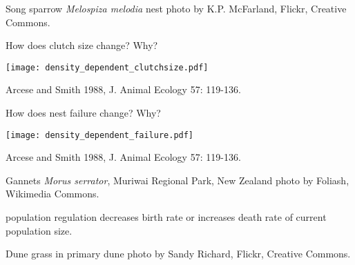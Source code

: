 \documentclass[t]{beamer}
\begin{document}
{
\begin{frame}[b]{}
\Tiny\textcolor{gray!20!white}{Song sparrow \textit{Melospiza melodia} nest photo by K.P. McFarland, Flickr, Creative Commons.}
\end{frame}
}


\begin{frame}[b]{How does clutch size change? Why?}
	\begin{center}
		\texttt{[image: density\_dependent\_clutchsize.pdf]}
	\end{center}	

	\tiny Arcese and Smith 1988, J. Animal Ecology 57: 119-136.
\end{frame}

\begin{frame}[b]{How does nest failure change? Why?}
	\begin{center}
		\texttt{[image: density\_dependent\_failure.pdf]}
	\end{center}	

	\tiny Arcese and Smith 1988, J. Animal Ecology 57: 119-136.
\end{frame}


{
\begin{frame}[b]{}
\Tiny\textcolor{orange5}{Gannets \textit{Morus serrator}, Muriwai Regional Park, New Zealand photo by Foliash, Wikimedia Commons.}
\end{frame}
}

{
\begin{frame}[b]{}
\end{frame}
}


\begin{frame}{}

	\hangpara {} population regulation decreases birth rate or increases death rate  of current population size.
		
\end{frame}

{
\begin{frame}[b]{}
\hfill\Tiny Dune grass in primary dune photo by Sandy Richard, Flickr, Creative Commons.
\end{frame}
}

{
\begin{frame}{}
\end{frame}
}

{
\begin{frame}{}
\end{frame}
}
\end{document}
